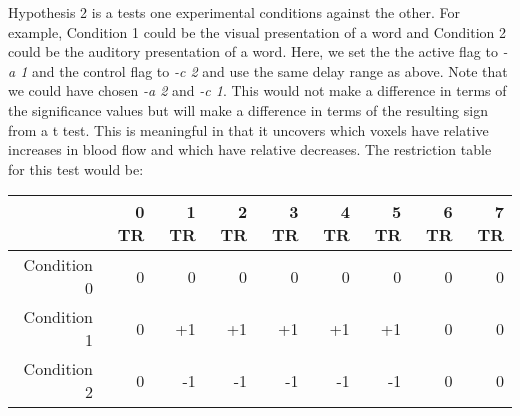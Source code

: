 \documentclass[10pt]{article}
\begin{document}
Hypothesis 2 is a tests one experimental conditions against the other.
For example, Condition 1 could be the visual presentation of a word
and Condition 2 could be the auditory presentation of a word.
Here, we set the the active flag to {\em -a 1} and the control
flag to {\em -c 2} and use the same delay range as above.  Note
that we could have chosen {\em -a 2} and {\em -c 1}.  This would not
make a difference in terms of the significance values but will make
a difference in terms of the resulting sign from a t test.  This
is meaningful in that it uncovers which voxels have relative increases in
blood flow and which have relative decreases.  The restriction table
for this test would be:\\

\begin{tabular}{|r||r|r|r|r|r|r|r|r|}\hline
& 0 TR & 1  TR & 2  TR & 3  TR & 4  TR & 5  TR & 6  TR & 7  TR\\ \hline \hline
Condition 0 & 0 &0 &0 &0 &0 &0  & 0  & 0    \\ \hline
Condition 1 & 0 &+1 &+1 &+1 &+1 &+1  & 0  & 0    \\ \hline
Condition 2 & 0 &-1 &-1 &-1 &-1 &-1  & 0  & 0    \\ \hline
\end{tabular}
\end{document}
